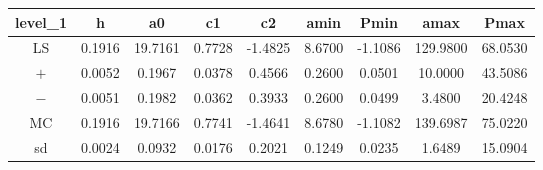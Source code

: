 \begin{table}
\begin{tabular}{ccccccccc}
\hline \hline
level_1 & h & a0 & c1 & c2 & amin & Pmin & amax & Pmax \\
\hline
LS & 0.1916 & 19.7161 & 0.7728 & -1.4825 & 8.6700 & -1.1086 & 129.9800 & 68.0530 \\
$ + $ & 0.0052 & 0.1967 & 0.0378 & 0.4566 & 0.2600 & 0.0501 & 10.0000 & 43.5086 \\
$ - $ & 0.0051 & 0.1982 & 0.0362 & 0.3933 & 0.2600 & 0.0499 & 3.4800 & 20.4248 \\
MC & 0.1916 & 19.7166 & 0.7741 & -1.4641 & 8.6780 & -1.1082 & 139.6987 & 75.0220 \\
sd & 0.0024 & 0.0932 & 0.0176 & 0.2021 & 0.1249 & 0.0235 & 1.6489 & 15.0904 \\
\hline
\end{tabular}
\end{table}
